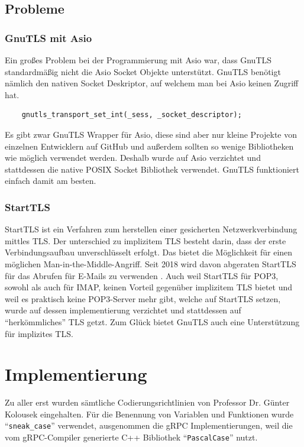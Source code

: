 \documentclass[12pt]{article}
\def\code#1{\texttt{#1}}
\begin{document}
\subsection{Probleme}
\subsubsection{GnuTLS mit Asio}
Ein großes Problem bei der Programmierung mit Asio war, dass GnuTLS 
standardmäßig nicht die Asio Socket Objekte unterstützt. GnuTLS benötigt
nämlich den nativen Socket Deskriptor, auf welchem man bei Asio keinen Zugriff
hat.
\begin{verbatim}
    gnutls_transport_set_int(_sess, _socket_descriptor);
\end{verbatim}
Es gibt zwar GnuTLS Wrapper für Asio, diese sind aber nur kleine Projekte von 
einzelnen Entwicklern auf GitHub und außerdem sollten so wenige Bibliotheken 
wie möglich verwendet werden. Deshalb wurde auf Asio verzichtet und stattdessen 
die native POSIX Socket Bibliothek verwendet. GnuTLS funktioniert einfach damit
am besten.

\subsubsection{StartTLS}
StartTLS ist ein Verfahren zum herstellen einer gesicherten 
Netzwerkverbindung mittles TLS. Der unterschied zu implizitem TLS besteht
darin, dass der erste Verbindungsaufbau unverschlüsselt erfolgt. Das bietet die
Möglichkeit für einen möglichen Man-in-the-Middle-Angriff. 
\newline
\newline
Seit 2018 wird davon
abgeraten StartTLS für das Abrufen für E-Mails zu verwenden \cite{rfc8460}.
Auch weil StartTLS für POP3, sowohl als auch für IMAP, keinen Vorteil gegenüber 
implizitem TLS bietet und weil es praktisch keine POP3-Server mehr gibt, welche
auf StartTLS setzen, wurde auf dessen implementierung verzichtet und 
stattdessen auf "`herkömmliches"' TLS getzt. Zum Glück bietet GnuTLS auch eine 
Unterstützung für implizites TLS.

\section{Implementierung}
Zu aller erst wurden sämtliche Codierungsrichtlinien von Professor Dr. Günter 
Kolousek eingehalten. Für die Benennung von Variablen und Funktionen wurde
"`\code{sneak\_case}"' verwendet, ausgenommen die gRPC Implementierungen, weil
die vom gRPC-Compiler generierte C++ Bibliothek "`\code{PascalCase}"' nutzt.
\end{document}
